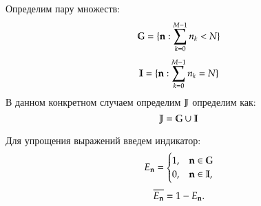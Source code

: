 Определим пару множеств:
\[\mathbb{G} = \{\bold{n} : \sum_{k=0}^{M-1}n_k < N\}\]
\[\mathbb{I} = \{\bold{n} : \sum_{k=0}^{M-1}n_k = N\}\]
В данном конкретном случаем определим \(\mathbb{J}\) определим как:
\[\mathbb{J} = \mathbb{G} \cup \mathbb{I}\]

Для упрощения выражений введем индикатор:
\begin{equation*}
    E_{\bold{n}} =
    \begin{cases}
        1, &{\bold{n} \in \mathbb{G} }\\
        0, &{\bold{n} \in \mathbb{I} },
    \end{cases}
\end{equation*}
\begin{equation*}
    \overline{E_{\bold{n}}} = 1 - E_{\bold{n}}.
\end{equation*}


